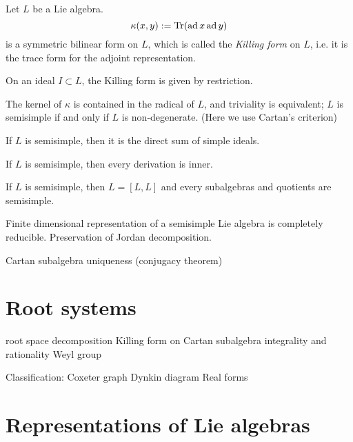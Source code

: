 \documentclass{../../large}
\begin{document}
\begin{prb}
Let $L$ be a Lie algebra.
\[\kappa(x,y):=\operatorname{Tr}(\operatorname{ad} x\operatorname{ad} y)\]
is a symmetric bilinear form on $L$, which is called the \emph{Killing form} on $L$, i.e. it is the trace form for the adjoint representation.
\begin{parts}
\item On an ideal $I\subset L$, the Killing form is given by restriction.
\item The kernel of $\kappa$ is contained in the radical of $L$, and triviality is equivalent; $L$ is semisimple if and only if $L$ is non-degenerate. (Here we use Cartan's criterion)
\item If $L$ is semisimple, then it is the direct sum of simple ideals.
\item If $L$ is semisimple, then every derivation is inner.
\item If $L$ is semisimple, then $L=[L,L]$ and every subalgebras and quotients are semisimple.
\end{parts}
\end{prb}


\begin{prb}
Finite dimensional representation of a semisimple Lie algebra is completely reducible.
Preservation of Jordan decomposition.
\end{prb}

\begin{prb}
Cartan subalgebra uniqueness (conjugacy theorem)
\end{prb}




\chapter{Root systems}
root space decomposition
Killing form on Cartan subalgebra
integrality and rationality
Weyl group


Classification:
Coxeter graph
Dynkin diagram
Real forms





\chapter{Representations of Lie algebras}
\end{document}
